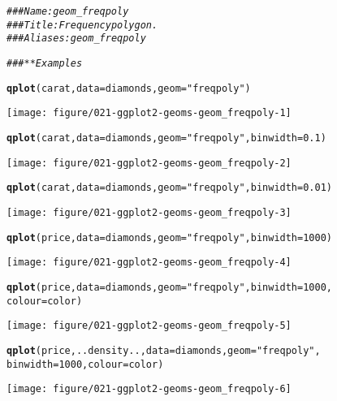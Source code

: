 \documentclass[a4paper,titlepage]{tufte-handout}\usepackage[]{graphicx}\usepackage[]{color}
\makeatletter
\def\maxwidth{ %
  \ifdim\Gin@nat@width>\linewidth
    \linewidth
  \else
    \Gin@nat@width
  \fi
}
\newcommand{\hlnum}[1]{\textcolor[rgb]{0.686,0.059,0.569}{#1}}%
\newcommand{\hlstr}[1]{\textcolor[rgb]{0.192,0.494,0.8}{#1}}%
\newcommand{\hlcom}[1]{\textcolor[rgb]{0.678,0.584,0.686}{\textit{#1}}}%
\newcommand{\hlstd}[1]{\textcolor[rgb]{0.345,0.345,0.345}{#1}}%
\newcommand{\hlkwc}[1]{\textcolor[rgb]{0.333,0.667,0.333}{#1}}%
\newcommand{\hlkwd}[1]{\textcolor[rgb]{0.737,0.353,0.396}{\textbf{#1}}}%
\newenvironment{kframe}{%
 \def\at@end@of@kframe{}%
 \ifinner\ifhmode%
  \def\at@end@of@kframe{\end{minipage}}%
  \begin{minipage}{\columnwidth}%
 \fi\fi%
 \def\FrameCommand##1{\hskip\@totalleftmargin \hskip-\fboxsep
 \colorbox{shadecolor}{##1}\hskip-\fboxsep
     \hskip-\linewidth \hskip-\@totalleftmargin \hskip\columnwidth}%
 \MakeFramed {\advance\hsize-\width
   \@totalleftmargin\z@ \linewidth\hsize
   \@setminipage}}%
 {\par\unskip\endMakeFramed%
 \at@end@of@kframe}
\newenvironment{knitrout}{}{} %
\makeatother
\begin{document}
\begin{knitrout}
\color{fgcolor}\begin{kframe}
\begin{alltt}
\hlcom{### Name: geom_freqpoly}
\hlcom{### Title: Frequency polygon.}
\hlcom{### Aliases: geom_freqpoly}

\hlcom{### ** Examples}

\hlkwd{qplot}\hlstd{(carat,} \hlkwc{data} \hlstd{= diamonds,} \hlkwc{geom} \hlstd{=} \hlstr{"freqpoly"}\hlstd{)}
\end{alltt}
\end{kframe}
\texttt{[image: figure/021-ggplot2-geoms-geom\_freqpoly-1]} 
\begin{kframe}\begin{alltt}
\hlkwd{qplot}\hlstd{(carat,} \hlkwc{data} \hlstd{= diamonds,} \hlkwc{geom} \hlstd{=} \hlstr{"freqpoly"}\hlstd{,} \hlkwc{binwidth} \hlstd{=} \hlnum{0.1}\hlstd{)}
\end{alltt}
\end{kframe}
\texttt{[image: figure/021-ggplot2-geoms-geom\_freqpoly-2]} 
\begin{kframe}\begin{alltt}
\hlkwd{qplot}\hlstd{(carat,} \hlkwc{data} \hlstd{= diamonds,} \hlkwc{geom} \hlstd{=} \hlstr{"freqpoly"}\hlstd{,} \hlkwc{binwidth} \hlstd{=} \hlnum{0.01}\hlstd{)}
\end{alltt}
\end{kframe}
\texttt{[image: figure/021-ggplot2-geoms-geom\_freqpoly-3]} 
\begin{kframe}\begin{alltt}
\hlkwd{qplot}\hlstd{(price,} \hlkwc{data} \hlstd{= diamonds,} \hlkwc{geom} \hlstd{=} \hlstr{"freqpoly"}\hlstd{,} \hlkwc{binwidth} \hlstd{=} \hlnum{1000}\hlstd{)}
\end{alltt}
\end{kframe}
\texttt{[image: figure/021-ggplot2-geoms-geom\_freqpoly-4]} 
\begin{kframe}\begin{alltt}
\hlkwd{qplot}\hlstd{(price,} \hlkwc{data} \hlstd{= diamonds,} \hlkwc{geom} \hlstd{=} \hlstr{"freqpoly"}\hlstd{,} \hlkwc{binwidth} \hlstd{=} \hlnum{1000}\hlstd{,}
  \hlkwc{colour} \hlstd{= color)}
\end{alltt}
\end{kframe}
\texttt{[image: figure/021-ggplot2-geoms-geom\_freqpoly-5]} 
\begin{kframe}\begin{alltt}
\hlkwd{qplot}\hlstd{(price, ..density..,} \hlkwc{data} \hlstd{= diamonds,} \hlkwc{geom} \hlstd{=} \hlstr{"freqpoly"}\hlstd{,}
  \hlkwc{binwidth} \hlstd{=} \hlnum{1000}\hlstd{,} \hlkwc{colour} \hlstd{= color)}
\end{alltt}
\end{kframe}
\texttt{[image: figure/021-ggplot2-geoms-geom\_freqpoly-6]} 

\end{knitrout}
\end{document}
